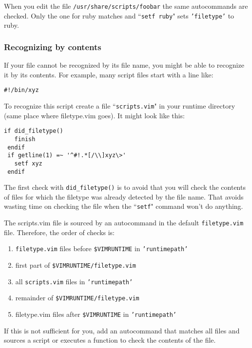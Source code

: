 When you edit the file \texttt{/usr/share/scripts/foobar} the same autocommands are checked.
Only the one for ruby matches and ``\texttt{setf ruby}" sets \texttt{'filetype'} to ruby.

\subsubsection{Recognizing by contents}
If your file cannot be recognized by its file name, you might be able to recognize it by its contents.
For example, many script files start with a line like:

\begin{Verbatim}[samepage=true]
    #!/bin/xyz 
\end{Verbatim}

To recognize this script create a file ``\texttt{scripts.vim}" in your runtime directory (same place where filetype.vim goes).
It might look like this:

\begin{Verbatim}[samepage=true]
 if did_filetype()
   finish
 endif
 if getline(1) =~ '^#!.*[/\\]xyz\>'
   setf xyz
 endif
\end{Verbatim}

The first check with \texttt{did\_filetype()} is to avoid that you will check the contents of files for which the filetype was already detected by the file name.
That avoids wasting time on checking the file when the ``\texttt{setf}" command won't do anything.

The scripts.vim file is sourced by an autocommand in the default \texttt{filetype.vim} file.
Therefore, the order of checks is:

\begin{enumerate}
				\item \texttt{filetype.vim} files before \texttt{\$VIMRUNTIME} in \texttt{'runtimepath'}
				\item first part of \texttt{\$VIMRUNTIME/filetype.vim}
				\item all \texttt{scripts.vim} files in \texttt{'runtimepath'}
				\item remainder of \texttt{\$VIMRUNTIME/filetype.vim}
				\item filetype.vim files after \texttt{\$VIMRUNTIME} in \texttt{'runtimepath'}
\end{enumerate}

If this is not sufficient for you, add an autocommand that matches all files and sources a script or executes a function to check the contents of the file.
\clearpage

